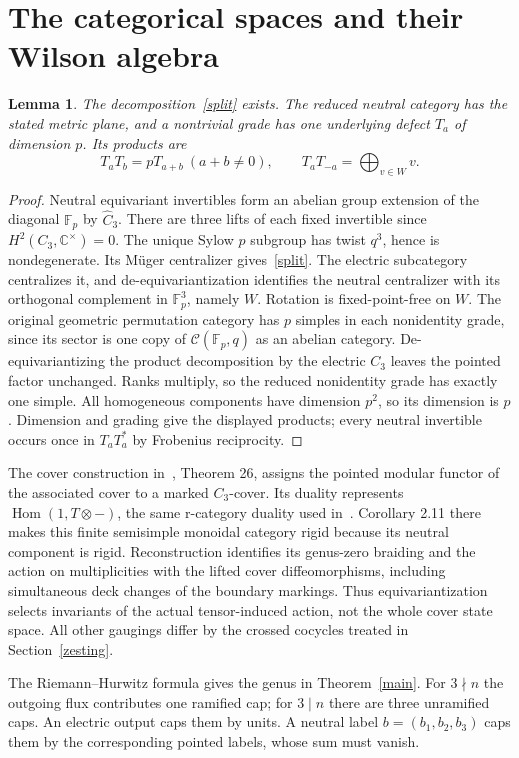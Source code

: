 \documentclass[11pt]{amsart}
\newtheorem{lemma}[theorem]{Lemma}
\newcommand{\Fp}{\mathbb F_p}
\newcommand{\Hom}{\operatorname{Hom}}
\begin{document}
\section{The categorical spaces and their Wilson algebra}\label{cat}
\begin{lemma}\label{diagonal}
The decomposition~\eqref{split} exists. The reduced neutral category
has the stated metric plane, and a nontrivial grade has one underlying
defect $T_a$ of dimension $p$. Its products are
\[
T_aT_b=pT_{a+b}\ (a+b\ne0),\qquad
T_aT_{-a}=\bigoplus_{v\in W}v.
\]
\end{lemma}
\begin{proof}
Neutral equivariant invertibles form an abelian group extension of
the diagonal $\Fp$ by $\widehat C_3$. There are three lifts of each
fixed invertible since $H^2(C_3,\mathbb C^\times)=0$.
The unique Sylow $p$ subgroup has twist $q^3$, hence is nondegenerate.
Its M\"uger centralizer gives~\eqref{split}. The electric subcategory
centralizes it, and de-equivariantization identifies the neutral
centralizer with its orthogonal complement in $\Fp^3$, namely $W$.
Rotation is fixed-point-free on $W$.
The original geometric permutation category has $p$ simples in each
nonidentity grade, since its sector is one copy of
$\mathcal C(\Fp,q)$ as an abelian category. De-equivariantizing
the product decomposition by the electric $C_3$ leaves the pointed
factor unchanged. Ranks multiply, so the reduced nonidentity grade
has exactly one simple. All homogeneous components have dimension
$p^2$, so its dimension is $p$. Dimension and grading
give the displayed products; every neutral invertible occurs once in
$T_aT_a^*$ by Frobenius reciprocity.
\end{proof}

The cover construction in~\cite{BS}, Theorem 26, assigns the pointed
modular functor of the associated cover to a marked $C_3$-cover.
Its duality represents $\Hom(1,T\otimes-)$, the same r-category
duality used in~\cite{DM}. Corollary 2.11 there makes this finite
semisimple monoidal category rigid because its neutral component is
rigid. Reconstruction identifies its genus-zero braiding and the
action on multiplicities with the lifted cover diffeomorphisms, including
simultaneous deck changes of the boundary markings. Thus equivariantization
selects invariants of the actual tensor-induced action, not the whole
cover state space. All other gaugings differ by the crossed cocycles
treated in Section~\ref{zesting}.

The Riemann--Hurwitz formula gives the genus in Theorem~\ref{main}.
For $3\nmid n$ the outgoing flux contributes one ramified cap; for
$3\mid n$ there are three unramified caps. An electric output caps
them by units. A neutral label $b=(b_1,b_2,b_3)$ caps them by the
corresponding pointed labels, whose sum must vanish.
\end{document}
